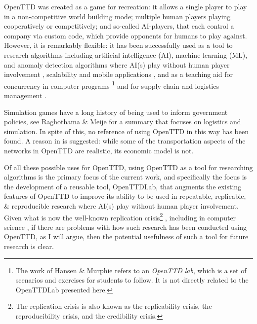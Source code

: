 \documentclass[logo,msc,dsti]{style/infthesis}    %
\newcommand{\singlespacedfootnote}[1]{{\singlespace\footnote{#1}}}
\begin{document}
OpenTTD was created as a game for recreation: it allows a single player to play in a non-competitive world building mode; multiple human players playing cooperatively or competitively; and so-called AI-players, that each control a company via custom code, which provide opponents for humans to play against. However, it is remarkably flexible: it has been successfully used as a tool to research algorithms including artificial intelligence (AI), machine learning (ML), and anomaly detection algorithms where AI(s) play without human player involvement \cite{beuneker2019autonomous, bijlsma2014evolving, konijnendijk2015mcts, lakomy2020railroad, rios2009trains, wisniewski2011artificial, volna2017fuzzy}, scalability and mobile applications \cite{jiang2018mirroring}, and as a teaching aid for concurrency in computer programs \cite{HansenMuprhie2018, marmorstein2015teaching}\singlespacedfootnote{The work of Hansen \& Murphie \cite{HansenMuprhie2018} refers to an \emph{OpenTTD lab}, which is a set of scenarios and exercises for students to follow. It is not directly related to the OpenTTDLab presented here.} and for supply chain and logistics management \cite{doi:10.1080/10494820.2016.1242503}.

Simulation games have a long history of being used to inform government policies, see Raghothama \& Meije \cite{raghothama2013review} for a summary that focuses on logistics and simulation. In spite of this, no reference of using OpenTTD in this way has been found. A reason in \cite{raghothama2013review} is suggested: while some of the transportation aspects of the networks in OpenTTD are realistic, its economic model is not.

Of all these possible uses for OpenTTD, using OpenTTD as a tool for researching algorithms is the primary focus of the current work, and specifically the focus is the development of a reusable tool, OpenTTDLab, that augments the existing features of OpenTTD to improve its ability to be used in repeatable, replicable, \& reproducible research where AI(s) play without human player involvement. Given what is now the well-known replication crisis\singlespacedfootnote{The replication crisis is also known as the replicability crisis, the reproducibility crisis, and the credibility crisis.} \cite{ioannidis2005most, baker20161}, including in computer science \cite{dalle2012reproducibility, CollbergChristianProebsting2016}, if there are problems with how such research has been conducted using OpenTTD, as I will argue, then the potential usefulness of such a tool for future research is clear.
\end{document}
